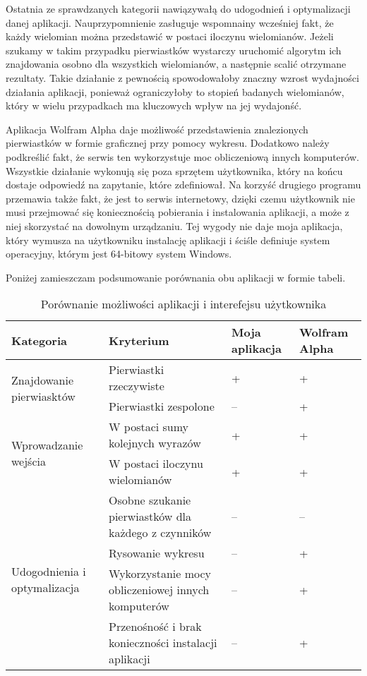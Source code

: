 \documentclass[oneside,a4paper]{book}
\begin{document}
	Ostatnia ze sprawdzanych kategorii nawiązywałą do udogodnień i optymalizacji danej aplikacji. Nauprzypomnienie zasługuje wspomnainy wcześniej fakt, że każdy wielomian można przedstawić w postaci iloczynu wielomianów. Jeżeli szukamy w takim przypadku pierwiastków wystarczy uruchomić algorytm ich znajdowania osobno dla wszystkich wielomianów, a następnie scalić otrzymane rezultaty. Takie działanie z pewnością spowodowałoby znaczny wzrost wydajności działania aplikacji, ponieważ ograniczyłoby to stopień badanych wielomianów, który w wielu przypadkach ma kluczowych wpływ na jej wydajonść.
	
	Aplikacja Wolfram Alpha daje możliwość przedstawienia znalezionych pierwiastków w formie graficznej przy pomocy wykresu. Dodatkowo należy podkreślić fakt, że serwis ten wykorzystuje moc obliczeniową innych komputerów. Wszystkie działanie wykonują się poza sprzętem użytkownika, który na końcu dostaje odpowiedź na zapytanie, które zdefiniował. Na korzyść drugiego programu przemawia także fakt, że jest to serwis internetowy, dzięki czemu użytkownik nie musi przejmować się koniecznością pobierania i instalowania aplikacji, a może z niej skorzystać na dowolnym urządzaniu. Tej wygody nie daje moja aplikacja, który wymusza na użytkowniku instalację aplikacji i ściśle definiuje system operacyjny, którym jest 64-bitowy system Windows.
	
	Poniżej zamieszczam podsumowanie porównania obu aplikacji w formie tabeli.
	
	\begin{table}
	\caption{Porównanie możliwości aplikacji i interefejsu użytkownika}
		\begin{tabular}{ |p{4.7cm}|p{5.5cm}|p{1.5cm}|p{1.5cm}| } 
			\hline
			Kategoria & Kryterium & Moja aplikacja & Wolfram Alpha \\
			\hline
			\multirow{2}{*}{Znajdowanie pierwiasktów}
			& Pierwiastki rzeczywiste & + & + \\
			& Pierwiastki zespolone & -- & + \\
			\hline
			\multirow{2}{*}{Wprowadzanie wejścia}
			&W postaci sumy kolejnych wyrazów & + & + \\
			&W postaci iloczynu wielomianów & + & + \\
			\hline
			\multirow{4}{*}{Udogodnienia i optymalizacja}
			&Osobne szukanie pierwiastków dla każdego z czynników & -- & -- \\
			&Rysowanie wykresu & -- & + \\
			&Wykorzystanie mocy obliczeniowej innych komputerów & -- & + \\
			&Przenośność i brak konieczności instalacji aplikacji & -- & + \\
			\hline
		\end{tabular}
	\end{table}
	
\end{document}
